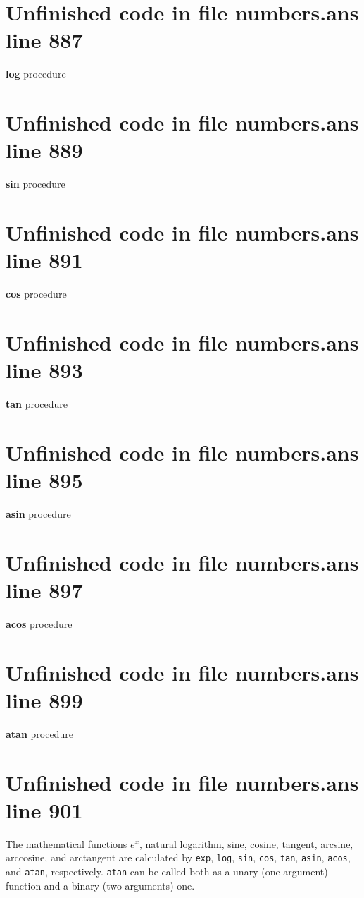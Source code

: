 \documentclass[twoside,9pt]{report}
\begin{document}
\section{Unfinished code in file numbers.ans line 887}

\noindent \textbf{log} procedure

\section{Unfinished code in file numbers.ans line 889}

\noindent \textbf{sin} procedure

\section{Unfinished code in file numbers.ans line 891}

\noindent \textbf{cos} procedure

\section{Unfinished code in file numbers.ans line 893}

\noindent \textbf{tan} procedure

\section{Unfinished code in file numbers.ans line 895}

\noindent \textbf{asin} procedure

\section{Unfinished code in file numbers.ans line 897}

\noindent \textbf{acos} procedure

\section{Unfinished code in file numbers.ans line 899}

\noindent \textbf{atan} procedure

\section{Unfinished code in file numbers.ans line 901}


The mathematical functions ${e}^{x}$, natural logarithm, sine, cosine, tangent, arcsine, arccosine, and arctangent are calculated by \texttt{exp}, \texttt{log}, \texttt{sin}, \texttt{cos}, \texttt{tan}, \texttt{asin}, \texttt{acos}, and \texttt{atan}, respectively. \texttt{atan} can be called both as a unary (one argument) function and a binary (two arguments) one.
\end{document}
